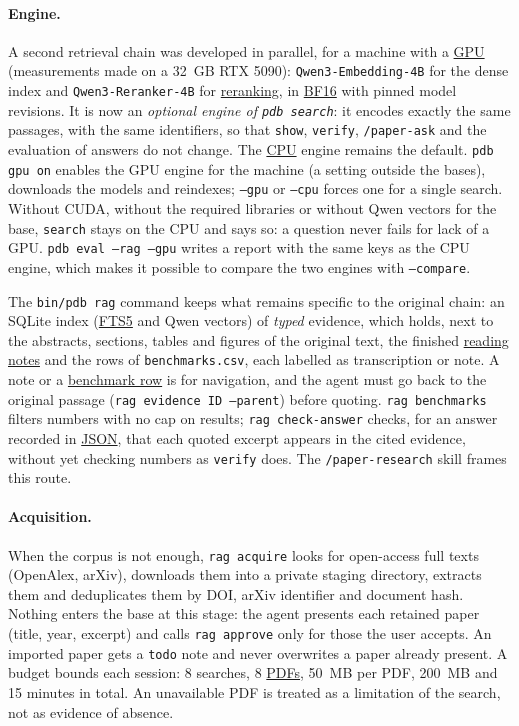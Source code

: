 \documentclass[11pt,a4paper]{article}
\newcommand{\cmd}[1]{\texttt{#1}}
\newcommand{\gl}[2]{\hyperlink{gl:#1}{\textcolor{glcolor}{#2}}}
\begin{document}
\paragraph{Engine.} A second retrieval chain was developed in parallel, for a machine with a
\gl{GPU}{GPU} (measurements made on a 32~GB RTX 5090): \cmd{Qwen3-Embedding-4B} for the dense index
and \cmd{Qwen3-Reranker-4B} for \gl{reranking}{reranking}, in \gl{BF16}{BF16} with pinned model revisions. It is now an
\emph{optional engine of \cmd{pdb search}}: it encodes exactly the same passages, with the same
identifiers, so that \cmd{show}, \cmd{verify}, \cmd{/paper-ask} and the evaluation of answers
do not change. The \gl{CPU}{CPU} engine remains the default. \cmd{pdb gpu on} enables the GPU engine
for the machine (a setting outside the bases), downloads the models and reindexes; \cmd{--gpu}
or \cmd{--cpu} forces one for a single search. Without CUDA, without the required libraries
or without Qwen vectors for the base, \cmd{search} stays on the CPU and says so: a question
never fails for lack of a GPU. \cmd{pdb eval --rag --gpu} writes a report with the same keys
as the CPU engine, which makes it possible to compare the two engines with \cmd{--compare}.

The \cmd{bin/pdb rag} command keeps what remains specific to the original chain: an SQLite
index (\gl{FTS5}{FTS5} and Qwen vectors) of \emph{typed} evidence, which holds, next to the abstracts,
sections, tables and figures of the original text, the finished \gl{fiche}{reading notes} and the rows of
\cmd{benchmarks.csv}, each labelled as transcription or note. A note or a
\gl{benchmark}{benchmark row} is for navigation, and the agent must go back to the original passage
(\cmd{rag evidence ID --parent}) before quoting. \cmd{rag benchmarks} filters numbers with no
cap on results; \cmd{rag check-answer} checks, for an answer recorded in
\gl{JSON}{JSON}, that each quoted excerpt appears in the cited evidence, without yet checking
numbers as \cmd{verify} does. The \cmd{/paper-research} skill frames this route.

\paragraph{Acquisition.} When the corpus is not enough, \cmd{rag acquire} looks for
open-access full texts (OpenAlex, arXiv), downloads them into a private staging directory,
extracts them and deduplicates them by DOI, arXiv identifier and document hash. Nothing
enters the base at this stage: the agent presents each retained paper (title, year,
excerpt) and calls \cmd{rag approve} only for those the user accepts. An imported paper gets
a \cmd{todo} note and never overwrites a paper already present. A budget bounds each session:
8 searches, 8 \gl{PDF}{PDFs}, 50~MB per PDF, 200~MB and 15 minutes in total. An unavailable PDF is
treated as a limitation of the search, not as evidence of absence.
\end{document}
